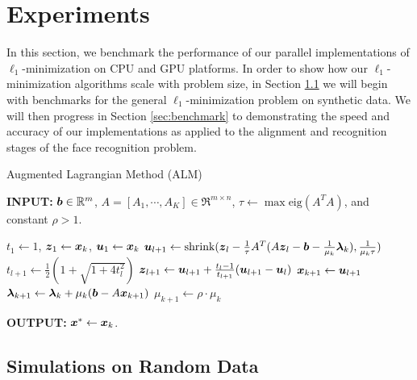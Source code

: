 \section{Experiments} 
\label{sec:experiment} 
In this section, we benchmark the
performance of our parallel implementations of $\ell_1$-minimization on CPU and GPU
platforms.  In order to show how our $\ell_1$-minimization algorithms scale with problem
size, in Section \ref{sec:simulation} we will begin with benchmarks for the
general $\ell_1$-minimization problem on synthetic data.  We will then progress in
Section \ref{sec:benchmark} to demonstrating the speed and accuracy of our
implementations as applied to the alignment and recognition stages of the face
recognition problem.

\begin{algorithm}[h]
\caption{Augmented Lagrangian Method (ALM)}
\small
{\bf INPUT:} $\boldsymbol{b} \in \mathbb R^m$, $A=[A_1,\cdots, A_K] \in \Re^{m \times n}$, $\tau\leftarrow \max\mbox{eig}(A^TA)$, and constant $\rho>1$.
\begin{algorithmic}[1]
\STATE $t_1 \leftarrow 1$, ${\boldsymbol{z}}_1 \leftarrow {\boldsymbol{x}}_k$, ${\boldsymbol{u}}_1 \leftarrow {\boldsymbol{x}}_k$ 
\STATE ${\boldsymbol{u}}_{l+1}  \leftarrow {\text{shrink}}({\boldsymbol{z}}_l - \frac{1}{\tau}A^T(A{\boldsymbol{z}}_l - \boldsymbol{b} - \frac{1}{\mu_k}\boldsymbol{\lambda}_k), \frac{1}{\mu_k\tau})$
\STATE $t_{l+1} \leftarrow \frac{1}{2}( 1 + \sqrt{1+4t_l^2})$
\STATE ${\boldsymbol{z}}_{l+1} \leftarrow {\boldsymbol{u}}_{l+1}+ \frac{t_l - 1}{t_{l+1}}({\boldsymbol{u}}_{l+1} - {\boldsymbol{u}}_l)$ 
\ENDWHILE 
\STATE ${\boldsymbol{x}}_{k+1} \leftarrow {\boldsymbol{u}}_{l+1}$ 
\STATE $\boldsymbol{\lambda}_{k+1} \leftarrow \boldsymbol{\lambda}_k + \mu_k (\boldsymbol{b} - A{\boldsymbol{x}}_{k+1})$ 
\STATE $\mu_{k+1} \leftarrow \rho\cdot\mu_k$ 
\ENDWHILE 
\end{algorithmic}
{\bf OUTPUT:} ${\boldsymbol{x}}^* \leftarrow {\boldsymbol{x}}_k$.
\label{alg:alm} 
\end{algorithm}

\subsection{Simulations on Random Data}
\label{sec:simulation}

